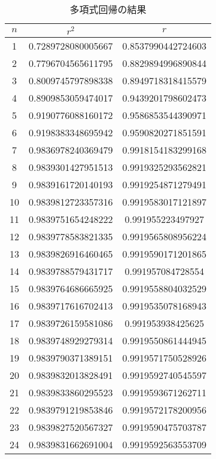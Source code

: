 \begin{table}
	\caption{多項式回帰の結果} \label{tab:polynomial-regression}
	\centering
	\begin{tabular}{ccc}
		\toprule
		$n$ & $r^2$              & $r$                \\
		\midrule
		1   & 0.7289728080005667 & 0.8537990442724603 \\
		2   & 0.7796704565611795 & 0.8829894996890844 \\
		3   & 0.8009745797898338 & 0.8949718318415579 \\
		4   & 0.8909853059474017 & 0.9439201798602473 \\
		5   & 0.9190776088160172 & 0.9586853544390971 \\
		6   & 0.9198383348695942 & 0.9590820271851591 \\
		7   & 0.9836978240369479 & 0.9918154183299168 \\
		8   & 0.9839301427951513 & 0.9919325293562821 \\
		9   & 0.9839161720140193 & 0.9919254871279491 \\
		10  & 0.9839812723357316 & 0.9919583017121897 \\
		11  & 0.9839751654248222 & 0.991955223497927  \\
		12  & 0.9839778583821335 & 0.9919565808956224 \\
		13  & 0.9839826916460465 & 0.9919590171201865 \\
		14  & 0.9839788579431717 & 0.991957084728554  \\
		15  & 0.9839764686665925 & 0.9919558804032529 \\
		16  & 0.9839717616702413 & 0.9919535078168943 \\
		17  & 0.9839726159581086 & 0.991953938425625  \\
		18  & 0.9839748929279314 & 0.9919550861444945 \\
		19  & 0.9839790371389151 & 0.9919571750528926 \\
		20  & 0.9839832013828491 & 0.9919592740545597 \\
		21  & 0.9839833860295523 & 0.9919593671262711 \\
		22  & 0.9839791219853846 & 0.9919572178200956 \\
		23  & 0.9839827520567327 & 0.9919590475703787 \\
		24  & 0.9839831662691004 & 0.9919592563553709 \\
		\bottomrule
	\end{tabular}
\end{table}
